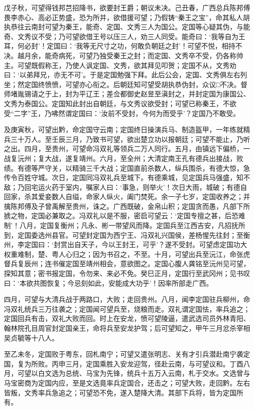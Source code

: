 \documentclass[]{article}
\begin{document}
戊子秋，可望得钱邦芑招降书，欲要封王爵；朝议未决。己丑春，广西总兵陈邦傅畏李赤心、高必正势盛，恐为所并，欲借援可望；乃假铸``秦王之宝''，命其私人胡执恭往云南封可望为秦王，能奇、定国、文秀三人为国公。定国等心疑其伪，与能奇、文秀议不受；乃可望欲借王号以压三人，劝三人同受。能奇曰：`我等自为王耳，何必封'！定国曰：`我等无尺寸之功，何敢负朝廷之封'！可望不悦，相持不决。越月余，能奇病死，可望乃独受秦王之封；而定国、文秀卒不受，仍各称帅主。可望既假称王，乃使人讽定国、文秀，欲其拜见叩贺；定国不从，文秀劝曰：`以弟拜兄，亦无不可'。于是定国勉强下拜。此后公会，定国、文秀俱左右列坐；然定国终愤愤，可望亦心衔之。后朝廷知可望受胡执恭伪封，众议□不决。督师堵胤锡请之于上，封为平辽王；差佥都御史赵昱至滇封之，并封定国为康国公、文秀为泰国公。定国知此封出自朝廷，与文秀议欲受封；可望已称秦王，不欲受``二字''王，乃咈然谓定国曰：`汝前不受封，今何为而受乎'？定国乃不敢受。

及庚寅秋，可望出黔，命定国守云南；定国终日操演兵马、制造盔甲，一年练就精兵三十万人。至壬辰三月，乃致书可望，欲出楚立功以报朝廷；可望不能止，乃听之出。四月，至贵州，可望命冯双礼等领兵二万人同行。五月，由镇远下偏桥，一战复沅州；复大战，遂复靖州。六月，至全州；大清定南王孔有德兵出接战，败绩。有德等严守关，以精骑三千大战；定国直前杀数人，纵兵围杀，有德大惊，急传令百姓守城。次日，定国同冯双礼兵至城下。有德乘城，见定国兵马强盛，知不敌；乃回宅运火药于室内，嘱家人曰：`事急，则举火'！次日大雨，城破；有德自回家，杀其爱妾数人自缢，命家人纵火，阖门焚死。余一子七岁，定国收养之；并擒陈邦傅及子曾禹解至贵州，诛之。广西既破，金帛山积；定国贪而愚，凡部下所掳之物，定国必兼取之。冯双礼以是不服，密启可望云：`定国专擅之甚，后恐难制'！八月，定国复衡州；凡永、彬一带望风而降。定国兵至江西吉安，凡招抚所到，定国委选州县官。可望封定国为西宁王、冯双礼兴国侯，差杨惺先往封；至衡州，李定国曰：`封赏出自天子，今以王封王，可乎'？遂不受封。可望虑定国功大权重难制，楚、粤人心归之；因为书召之，不至。十月，可望出兵至沅江，命张虎督兵复辰州；连书催定国至靖州相会，意欲图之。定国心腹人龚铭至沅州见可望，探知其意；密书报定国，令勿来、来必不免。癸巳正月，定国行至武冈州；见书叹曰：`本欲共图恢复；今忌刻如此，安能成大功乎'！因率所部走广西。

四月，可望与大清兵战于两路口，大败；走回贵州。八月，闻李定国驻兵柳州，命冯双礼统兵三万往袭之；定国闻可望兵至，烧粮而走。双礼谓定国怯，率兵追之；定国回兵有击，双礼大败而回。时上在安龙，愤可望陵逼，遣武选司员外林青阳、翰林院孔目周官封定国亲王，命将兵至安龙护驾；后可望知之，甲午三月忿杀宰相吴贞毓等十八人。

至乙未冬，定国败于粤东，回札南宁；可望又遣张明志、关有才引兵潜赴南宁袭定国，复为所败。丙申三月，定国乘胜入安龙迎驾，径赴云南，与可望议和。丁酉八月，可望以白文选为总统、马宝为先锋，统兵十五万入云南，札于交水。文选曾与马宝密商为定国内应，至是文选竟率兵定国合，还击之；可望大败，走回黔。左右皆叛，文秀率兵急追之；可望恐不免，遂入楚降大清。其部下兵将，皆为定国所有。
\end{document}
